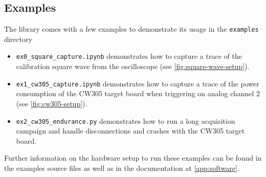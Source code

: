 \documentclass[a4paper,english,twoside,10pt]{article}
\begin{document}
\subsection{Examples}
The library comes with a few examples to demonstrate its usage in the \texttt{examples} directory
\begin{itemize}
	\item \texttt{ex0\_square\_capture.ipynb} demonstrates how to capture a trace of the calibration square wave from the oscilloscope (see \autoref{fig:square-wave-setup}).
	\item \texttt{ex1\_cw305\_capture.ipynb} demonstrates how to capture a trace of the power consumption of the CW305 target board\cite{cw305:spec} when triggering on analog channel 2 (see \autoref{fig:cw305-setup}).
	\item \texttt{ex2\_cw305\_endurance.py} demonstrates how to run a long acquisition campaign and handle disconnections and crashes with the CW305 target board\cite{cw305:spec}.
\end{itemize}

Further information on the hardware setup to run these examples can be found in the examples source files as well as in the documentation at \autoref{app:software}.
\end{document}
